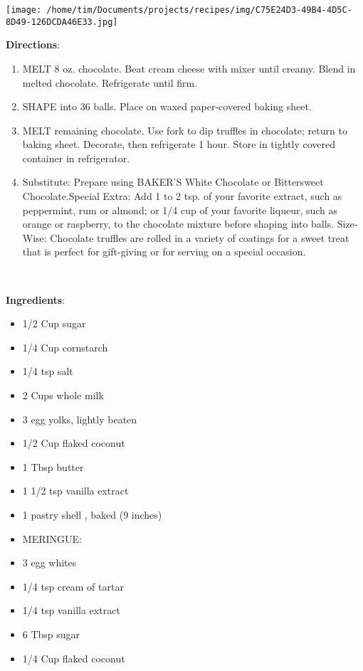 \documentclass[11pt, twoside, openany]{book}
\begin{document}
\begin{minipage}[t]{0.2\linewidth}
\centering \strut\vspace*{-\baselineskip}\newline
\texttt{[image: /home/tim/Documents/projects/recipes/img/C75E24D3-49B4-4D5C-8D49-126DCDA46E33.jpg]}\\
\end{minipage}\vspace{3mm}
\textbf{Directions}:
\vspace{-3mm}\begin{enumerate}\setlength\itemsep{-1mm}
\item MELT 8 oz. chocolate. Beat cream cheese with mixer until creamy. Blend in melted chocolate. Refrigerate until firm.
\item SHAPE into 36 balls. Place on waxed paper-covered baking sheet.
\item MELT remaining chocolate. Use fork to dip truffles in chocolate; return to baking sheet. Decorate, then refrigerate 1 hour. Store in tightly covered container in refrigerator.
\item Substitute: Prepare using BAKER'S White Chocolate or Bittersweet Chocolate.Special Extra: Add 1 to 2 tsp. of your favorite extract, such as peppermint, rum or almond; or 1/4 cup of your favorite liqueur, such as orange or raspberry, to the chocolate mixture before shaping into balls. Size-Wise: Chocolate truffles are rolled in a variety of coatings for a sweet treat that is perfect for gift-giving or for serving on a special occasion.
\end{enumerate}
 \label{coconut-cream-angel-pie-recipe}\hfill\textit{}\\
\begin{minipage}[t]{0.8\linewidth}
\textbf{Ingredients}:\vspace{-3mm}
\begin{multicols}{2}
\begin{itemize}\setlength\itemsep{-1mm}
\item 1/2 Cup sugar
\item 1/4 Cup cornstarch
\item 1/4 tsp salt
\item 2 Cups whole milk
\item 3 egg yolks, lightly beaten
\item 1/2 Cup flaked coconut
\item 1 Tbsp butter
\item 1 1/2 tsp vanilla extract
\item 1 pastry shell , baked (9 inches)
\item MERINGUE:
\item 3 egg whites
\item 1/4 tsp cream of tartar
\item 1/4 tsp vanilla extract
\item 6 Tbsp sugar
\item 1/4 Cup flaked coconut
\end{itemize}
\end{multicols}
\end{minipage}
\end{document}
